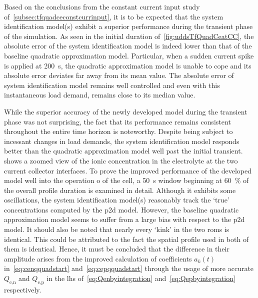 Based   on   the   conclusions   from   the   constant   current   input   study
of~\cref{subsec:tfquadceconstcurrinput},  it   is  to   be  expected   that  the
system  identification  model(s)  exhibit  a  superior  performance  during  the
transient  phase   of  the   simulation.  As  seen   in  the   initial  duration
of~\cref{fig:uddsTfQuadCeatCC}, the absolute error  of the system identification
model is indeed  lower than that of the baseline  quadratic approximation model.
Particular, when a sudden current spike is applied at \approx \SI{200}{\second},
the  quadratic approximation  model is  unable to  cope and  its absolute  error
deviates  far  away   from  its  mean  value.  The  absolute   error  of  system
identification model  remains well controlled  and even with  this instantaneous
load demand, remains close to its median value.

While the  superior accuracy of the  newly developed model during  the transient
phase  was not  surprising, the  fact  that its  performance remains  consistent
throughout  the  entire  time  horizon  is  noteworthy.  Despite  being  subject
to  incessant  changes   in  load  demands,  the   system  identification  model
responds better  than the  quadratic approximation model  well past  the initial
transient.   shows  a  zoomed  view of  the
ionic concentration in the electrolyte  at the two current collector interfaces.
To prove the improved performance of the developed model well into the operation
o of the cell, a  \SI{50}{\second} window beginning at \approx \SI{60}{\percent}
of the overall profile duration is examined in detail. Although it exhibits some
oscillations,  the system  identification model(s)  reasonably track  the `true'
concentrations computed by the \gls{p2d}  model. However, the baseline quadratic
approximation  model seems  to suffer  from  a large  bias with  respect to  the
\gls{p2d} model.  It should also  be noted that nearly  every `kink' in  the two
\glspl{rom}  is identical.  This could  be attributed  to the  fact the  spatial
profile  used  in  both of  them  is  identical.  Hence,  it must  be  concluded
that  the difference  in their  amplitude arises  from the  improved calculation
of coefficients  $a_k(t)$ in~\cref{eq:cenqquadstart} and~\cref{eq:cepqquadstart}
through  the  usage  of  more  accurate  $Q_{\text{e,n}}$  and  $Q_{\text{e,p}}$
in  the  \gls{lhs} of~\cref{eq:Qenbyintegration}  and~\cref{eq:Qepbyintegration}
respectively.

